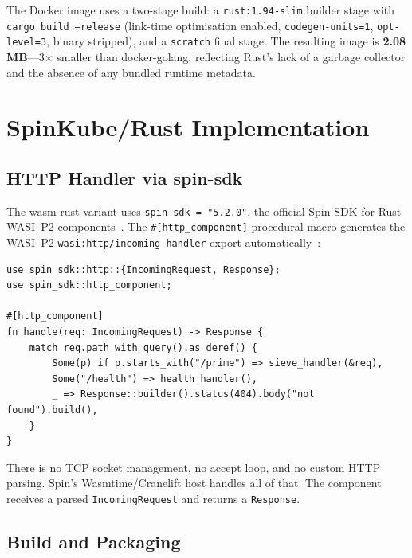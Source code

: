 \begin{sloppypar}
The Docker image uses a two-stage build: a \texttt{rust:1.94-slim} builder stage with \texttt{cargo build --release} (link-time optimisation enabled, \texttt{codegen-units=1}, \texttt{opt-level=3}, binary stripped), and a \texttt{scratch} final stage. The resulting image is \textbf{2.08\,MB}---3$\times$ smaller than docker-golang, reflecting Rust's lack of a garbage collector and the absence of any bundled runtime metadata.
\end{sloppypar}

\section{SpinKube/Rust Implementation}
\label{sec:impl_spin_rust}

\subsection{HTTP Handler via spin-sdk}

\begin{sloppypar}
The wasm-rust variant uses \texttt{spin-sdk~=~"5.2.0"}, the official Spin \acs{SDK} for Rust \acs{WASI}~P2 components~\cite{spinframework2024rust}. The \texttt{\#[http\_component]} procedural macro generates the \acs{WASI}~P2 \texttt{wasi:http/incoming-handler} export automatically~\cite{spinframework2024rust}:
\end{sloppypar}

\begin{verbatim}
use spin_sdk::http::{IncomingRequest, Response};
use spin_sdk::http_component;

#[http_component]
fn handle(req: IncomingRequest) -> Response {
    match req.path_with_query().as_deref() {
        Some(p) if p.starts_with("/prime") => sieve_handler(&req),
        Some("/health") => health_handler(),
        _ => Response::builder().status(404).body("not found").build(),
    }
}
\end{verbatim}

\begin{sloppypar}
There is no \acs{TCP} socket management, no accept loop, and no custom \acs{HTTP} parsing. Spin's Wasmtime/Cranelift host handles all of that. The component receives a parsed \texttt{IncomingRequest} and returns a \texttt{Response}.
\end{sloppypar}

\subsection{Build and Packaging}

